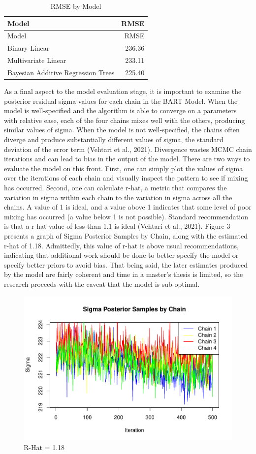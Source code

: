\documentclass[
  12pt,
]{article}
\begin{document}
\begin{longtable}[]{@{}lr@{}}
\caption{RMSE by Model}\tabularnewline
\toprule\noalign{}
Model & RMSE \\
\midrule\noalign{}
\endfirsthead
\toprule\noalign{}
Model & RMSE \\
\midrule\noalign{}
\endhead
\bottomrule\noalign{}
\endlastfoot
Binary Linear & 236.36 \\
Multivariate Linear & 233.11 \\
Bayesian Additive Regression Trees & 225.40 \\
\end{longtable}

As a final aspect to the model evaluation stage, it is important to
examine the posterior residual sigma values for each chain in the BART
Model. When the model is well-specified and the algorithm is able to
converge on a parameters with relative ease, each of the four chains
mixes well with the others, producing similar values of sigma. When the
model is not well-specified, the chains often diverge and produce
substantially different values of sigma, the standard deviation of the
error term (Vehtari et al., 2021). Divergence wastes MCMC chain
iterations and can lead to bias in the output of the model. There are
two ways to evaluate the model on this front. First, one can simply plot
the values of sigma over the iterations of each chain and visually
inspect the pattern to see if mixing has occurred. Second, one can
calculate r-hat, a metric that compares the variation in sigma within
each chain to the variation in sigma across all the chains. A value of 1
is ideal, and a value above 1 indicates that some level of poor mixing
has occurred (a value below 1 is not possible). Standard recommendation
is that a r-hat value of less than 1.1 is ideal (Vehtari et al., 2021).
Figure 3 presents a graph of Sigma Posterior Samples by Chain, along
with the estimated r-hat of 1.18. Admittedly, this value of r-hat is
above usual recommendations, indicating that additional work should be
done to better specify the model or specify better priors to avoid bias.
That being said, the later estimates produced by the model are fairly
coherent and time in a master's thesis is limited, so the research
proceeds with the caveat that the model is sub-optimal.

\begin{figure}

{\centering \includegraphics[width=0.6\linewidth]{figures/unnamed-chunk-11-1} 

}

\caption{R-Hat = 1.18}\label{fig:unnamed-chunk-11}
\end{figure}
\end{document}
